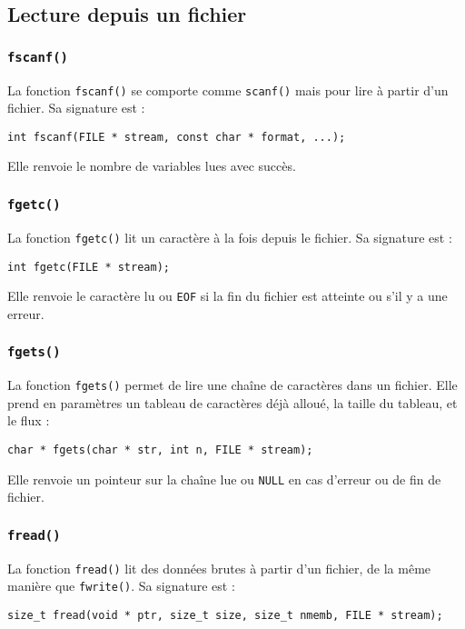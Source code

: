 \documentclass[french,11pt]{article}
\begin{document}
\subsection{Lecture depuis un fichier}

\subsubsection{\texttt{fscanf()}}
La fonction \texttt{fscanf()} se comporte comme \texttt{scanf()} mais pour lire à partir d’un fichier. Sa signature est :
\begin{verbatim}
int fscanf(FILE * stream, const char * format, ...);
\end{verbatim}
Elle renvoie le nombre de variables lues avec succès.

\subsubsection{\texttt{fgetc()}}
La fonction \texttt{fgetc()} lit un caractère à la fois depuis le fichier. Sa signature est :
\begin{verbatim}
int fgetc(FILE * stream);
\end{verbatim}
Elle renvoie le caractère lu ou \texttt{EOF} si la fin du fichier est atteinte ou s'il y a une erreur.

\subsubsection{\texttt{fgets()}}
La fonction \texttt{fgets()} permet de lire une chaîne de caractères dans un fichier. Elle prend en paramètres un tableau de caractères déjà alloué, la taille du tableau, et le flux :
\begin{verbatim}
char * fgets(char * str, int n, FILE * stream);
\end{verbatim}
Elle renvoie un pointeur sur la chaîne lue ou \texttt{NULL} en cas d'erreur ou de fin de fichier.

\subsubsection{\texttt{fread()}}
La fonction \texttt{fread()} lit des données brutes à partir d’un fichier, de la même manière que \texttt{fwrite()}. Sa signature est :
\begin{verbatim}
size_t fread(void * ptr, size_t size, size_t nmemb, FILE * stream);
\end{verbatim}
\end{document}
